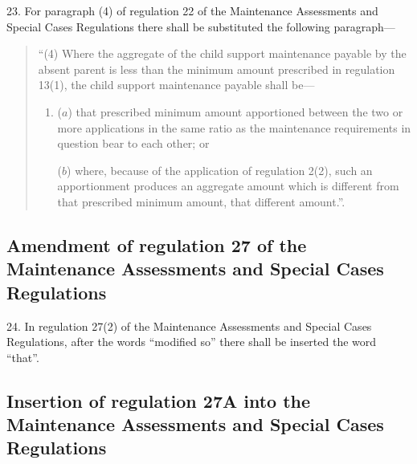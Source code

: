 \documentclass[12pt,a4paper]{article}
\begin{document}
23.  For paragraph (4) of regulation 22 of the Maintenance Assessments and Special Cases Regulations there shall be substituted the following paragraph---
\begin{quotation}
\begin{sloppypar}
“(4) Where the aggregate of the child support maintenance payable by the absent parent is less than the minimum amount prescribed in regulation 13(1), the child support maintenance payable shall be---
\end{sloppypar}
\begin{enumerate}\item[]
($a$) that prescribed minimum amount apportioned between the two or more applications in the same ratio as the maintenance requirements in question bear to each other; or

($b$) where, because of the application of regulation 2(2), such an apportionment produces an aggregate amount which is different from that prescribed minimum amount, that different amount.”.
\end{enumerate}
\end{quotation}

\subsection[24. Amendment of regulation 27 of the Maintenance Assessments and Special Cases Regulations]{Amendment of regulation 27 of the Maintenance Assessments and Special Cases Regulations}

24.  In regulation 27(2) of the Maintenance Assessments and Special Cases Regulations, after the words “modified so” there shall be inserted the word “that”.

\subsection[25. Insertion of regulation 27A into the Maintenance Assessments and Special Cases Regulations]{Insertion of regulation 27A into the Maintenance Assessments and Special Cases Regulations}
\end{document}
